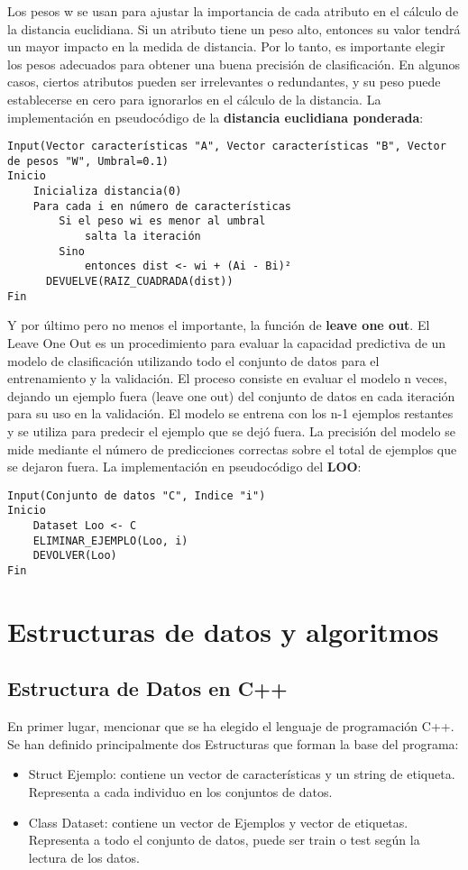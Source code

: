 Los pesos w se usan para ajustar la importancia de cada atributo en el cálculo de la distancia euclidiana. Si un atributo tiene un peso alto, entonces su valor tendrá un mayor impacto en la medida de distancia. Por lo tanto, es importante elegir los pesos adecuados para obtener una buena precisión de clasificación. En algunos casos, ciertos atributos pueden ser irrelevantes o redundantes, y su peso puede establecerse en cero para ignorarlos en el cálculo de la distancia. La implementación en pseudocódigo de la \textbf{distancia euclidiana ponderada}:

\begin{verbatim}
Input(Vector características "A", Vector características "B", Vector de pesos "W", Umbral=0.1)
Inicio
    Inicializa distancia(0)
    Para cada i en número de características
        Si el peso wi es menor al umbral
            salta la iteración
        Sino
            entonces dist <- wi + (Ai - Bi)²
      DEVUELVE(RAIZ_CUADRADA(dist))
Fin
\end{verbatim}

Y por último pero no menos el importante, la función de \textbf{leave one out}. El Leave One Out es un procedimiento para evaluar la capacidad predictiva de un modelo de clasificación utilizando todo el conjunto de datos para el entrenamiento y la validación. El proceso consiste en evaluar el modelo n veces, dejando un ejemplo fuera (leave one out) del conjunto de datos en cada iteración para su uso en la validación. El modelo se entrena con los n-1 ejemplos restantes y se utiliza para predecir el ejemplo que se dejó fuera. La precisión del modelo se mide mediante el número de predicciones correctas sobre el total de ejemplos que se dejaron fuera. La implementación en pseudocódigo del \textbf{LOO}:

\begin{verbatim}
Input(Conjunto de datos "C", Indice "i")
Inicio
    Dataset Loo <- C
    ELIMINAR_EJEMPLO(Loo, i)
    DEVOLVER(Loo)
Fin
\end{verbatim}


\section{Estructuras de datos y algoritmos}
\subsection{Estructura de Datos en C++}
En primer lugar, mencionar que se ha elegido el lenguaje de programación C++. Se han definido principalmente dos Estructuras que forman la base del programa:
\begin{itemize}
	\item Struct Ejemplo: contiene un vector de características y un string de etiqueta. Representa a cada individuo en los conjuntos de datos.
	\item Class Dataset: contiene un vector de Ejemplos y vector de etiquetas. Representa a todo el conjunto de datos, puede ser train o test según la lectura de los datos.
\end{itemize}


